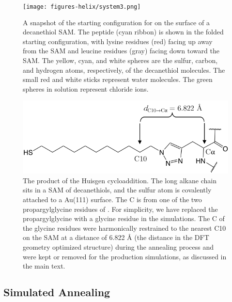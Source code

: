\begin{figure}
    \center
    \texttt{[image: figures-helix/system3.png]}
    \caption{A snapshot of the starting configuration for \pep{} on the surface of a decanethiol SAM. The peptide (cyan ribbon) is shown in the folded starting configuration, with lysine residues (red) facing up away from the SAM and leucine residues (gray) facing down toward the SAM. The yellow, cyan, and white spheres are the sulfur, carbon, and hydrogen atoms, respectively, of the decanethiol molecules. The small red and white sticks represent water molecules. The green spheres in solution represent chloride ions. }
    \label{fig:helix-system}
\end{figure}

\begin{figure}
    \center
    \includegraphics[width=\double]{figures-helix/Linker_figure.png}
    \caption{
        The product of the Huisgen cycloaddition. 
        The long alkane chain sits in a SAM of decanethiols, and the sulfur atom is covalently attached to a Au(111) surface. 
        The C\textalpha{} is from one of the two propargylglycine residues of \pep{}. 
        For simplicity, we have replaced the propargylglycine with a glycine residue in the simulations. 
        The C\textalpha{} of the glycine residues were harmonically restrained to the nearest C10 on the SAM at a distance of 6.822 \si{\angstrom} (the distance in the DFT geometry optimized structure) during the annealing process and were kept or removed for the production simulations, as discussed in the main text.
    }
    \label{fig:helix-linker}
\end{figure}

\subsection{Simulated Annealing}\label{helix-anneal}

